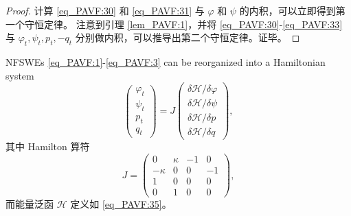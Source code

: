 \begin{proof}
计算 \eqref{eq_PAVF:30} 和 \eqref{eq_PAVF:31} 与 $\varphi$ 和 $\psi$ 的内积，可以立即得到第一个守恒定律。
注意到引理 \ref{lem_PAVF:1}，并将 \eqref{eq_PAVF:30}-\eqref{eq_PAVF:33} 与 $\varphi_{t}, \psi_{t}, p_{t},-q_{t}$ 分别做内积，可以推导出第二个守恒定律。证毕。
\end{proof}

\begin{theorem}\label{thm_PAVF:2}
	NFSWEs \eqref{eq_PAVF:1}-\eqref{eq_PAVF:3} can be reorganized into a Hamiltonian system
\begin{equation}\label{eq_PAVF:37}
	\left(\begin{array}{l}
		\varphi_{t} \\
		\psi_{t} \\
		p_{t} \\
		q_{t}
		\end{array}\right)=J\left(\begin{array}{l}
		\delta \mathcal{H} / \delta \varphi \\
		\delta \mathcal{H} / \delta \psi \\
		\delta \mathcal{H} / \delta p \\
		\delta \mathcal{H} / \delta q
		\end{array}\right),
\end{equation}
其中 Hamilton 算符
\begin{equation}\label{eq_PAVF:37b}
J=\left(\begin{array}{cccc}
		0 & \kappa & -1 & 0 \\
		-\kappa & 0 & 0 & -1 \\
		1 & 0 & 0 & 0 \\
		0 & 1 & 0 & 0
		\end{array}\right),
\end{equation}
而能量泛函 $\mathcal{H}$ 定义如 \eqref{eq_PAVF:35}。
\end{theorem}

